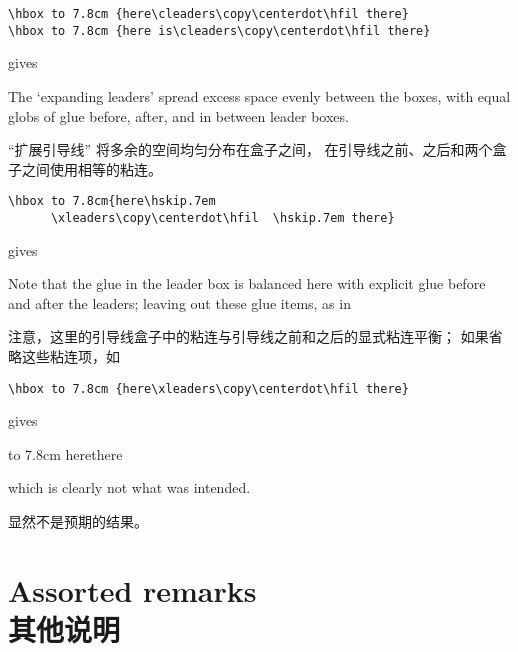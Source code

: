 \begin{example}
\begin{verbatim}
\hbox to 7.8cm {here\cleaders\copy\centerdot\hfil there}
\hbox to 7.8cm {here is\cleaders\copy\centerdot\hfil there}
\end{verbatim}
gives 
The `expanding leaders'  spread excess space evenly
between the boxes, with equal globs of glue before, after,
and in between leader boxes.

“扩展引导线”  将多余的空间均匀分布在盒子之间，
在引导线之前、之后和两个盒子之间使用相等的粘连。
\end{example}



\begin{example} \begin{verbatim}
\hbox to 7.8cm{here\hskip.7em
      \xleaders\copy\centerdot\hfil  \hskip.7em there}
\end{verbatim}
gives  Note that the glue in the leader box is balanced here
with explicit glue before and after the leaders;
leaving out these glue items, as in

注意，这里的引导线盒子中的粘连与引导线之前和之后的显式粘连平衡；
如果省略这些粘连项，如
\begin{verbatim}
\hbox to 7.8cm {here\xleaders\copy\centerdot\hfil there}
\end{verbatim}
gives \begin{disp}\leavevmode
\hbox to 7.8cm {here\xleaders\copy\centerdot\hfil there}
\end{disp}
which is clearly not what was intended.

显然不是预期的结果。
\end{example}


\section{Assorted remarks\\其他说明}

